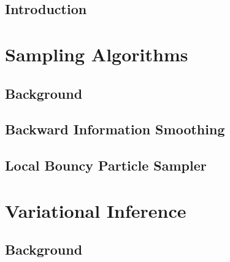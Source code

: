 
\singlespacing
\setcounter{tocdepth}{2}
\setcounter{secnumdepth}{2}
\iftoc\tableofcontents\fi
{}
\setcounter{page}{1}
\onehalfspacing

\raggedbottom



\doublespacing


\chapter{Introduction}\setcounter{page}{1}

\ifintro\fi

\part{Sampling Algorithms} %

\chapter{Background}

\ifbgs\fi

\chapter{Backward Information Smoothing}

\iftfs\fi

\chapter{Local Bouncy Particle Sampler}

\iflbps\fi

\part{Variational Inference} %

\chapter{Background}


